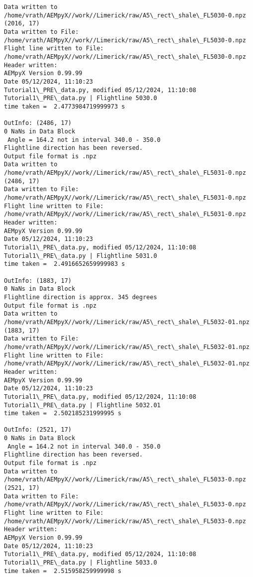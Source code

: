 \documentclass[11pt]{article}
\begin{document}
    \begin{Verbatim}[commandchars=\\\{\}]
Data written to
/home/vrath/AEMpyX//work//Limerick/raw/A5\_rect\_shale\_FL5030-0.npz
(2016, 17)
Data written to File:
/home/vrath/AEMpyX//work//Limerick/raw/A5\_rect\_shale\_FL5030-0.npz
Flight line written to File:
/home/vrath/AEMpyX//work//Limerick/raw/A5\_rect\_shale\_FL5030-0.npz
Header written:
AEMpyX Version 0.99.99
Date 05/12/2024, 11:10:23
Tutorial1\_PRE\_data.py, modified 05/12/2024, 11:10:08
Tutorial1\_PRE\_data.py | Flightline 5030.0
time taken =  2.4773984719999973 s

OutInfo: (2486, 17)
0 NaNs in Data Block
 Angle = 164.2 not in interval 340.0 - 350.0
Flightline direction has been reversed.
Output file format is .npz
Data written to
/home/vrath/AEMpyX//work//Limerick/raw/A5\_rect\_shale\_FL5031-0.npz
(2486, 17)
Data written to File:
/home/vrath/AEMpyX//work//Limerick/raw/A5\_rect\_shale\_FL5031-0.npz
Flight line written to File:
/home/vrath/AEMpyX//work//Limerick/raw/A5\_rect\_shale\_FL5031-0.npz
Header written:
AEMpyX Version 0.99.99
Date 05/12/2024, 11:10:23
Tutorial1\_PRE\_data.py, modified 05/12/2024, 11:10:08
Tutorial1\_PRE\_data.py | Flightline 5031.0
time taken =  2.4916652659999983 s

OutInfo: (1883, 17)
0 NaNs in Data Block
Flightline direction is approx. 345 degrees
Output file format is .npz
Data written to
/home/vrath/AEMpyX//work//Limerick/raw/A5\_rect\_shale\_FL5032-01.npz
(1883, 17)
Data written to File:
/home/vrath/AEMpyX//work//Limerick/raw/A5\_rect\_shale\_FL5032-01.npz
Flight line written to File:
/home/vrath/AEMpyX//work//Limerick/raw/A5\_rect\_shale\_FL5032-01.npz
Header written:
AEMpyX Version 0.99.99
Date 05/12/2024, 11:10:23
Tutorial1\_PRE\_data.py, modified 05/12/2024, 11:10:08
Tutorial1\_PRE\_data.py | Flightline 5032.01
time taken =  2.502185231999995 s

OutInfo: (2521, 17)
0 NaNs in Data Block
 Angle = 164.2 not in interval 340.0 - 350.0
Flightline direction has been reversed.
Output file format is .npz
Data written to
/home/vrath/AEMpyX//work//Limerick/raw/A5\_rect\_shale\_FL5033-0.npz
(2521, 17)
Data written to File:
/home/vrath/AEMpyX//work//Limerick/raw/A5\_rect\_shale\_FL5033-0.npz
Flight line written to File:
/home/vrath/AEMpyX//work//Limerick/raw/A5\_rect\_shale\_FL5033-0.npz
Header written:
AEMpyX Version 0.99.99
Date 05/12/2024, 11:10:23
Tutorial1\_PRE\_data.py, modified 05/12/2024, 11:10:08
Tutorial1\_PRE\_data.py | Flightline 5033.0
time taken =  2.515958259999998 s


\end{Verbatim}
\end{document}
